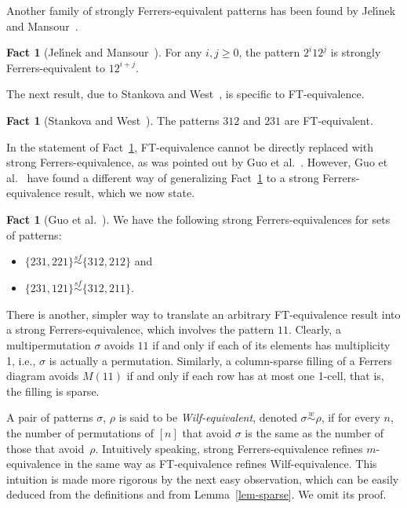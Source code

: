\documentclass[11pt]{amsart}
\theoremstyle{plain}
\theoremstyle{definition}
\newtheorem{fact}[theorem]{Fact}
\newcommand{\wsim}{\stackrel{w}{\sim}}
\newcommand{\sfsim}{\stackrel{sf}{\sim}}
\begin{document}
Another family of strongly Ferrers-equivalent patterns has been found by Jel\'\i nek and
Mansour~\cite[Lemma 39]{JM0}.

\begin{fact}[Jel\'\i nek and Mansour~\cite{JM0}]\label{fac-2p12q}
For any $i,j\ge 0$, the pattern $2^i12^j$ is strongly Ferrers-equivalent to $12^{i+j}$.
\end{fact}

The next result, due to Stankova and West~\cite{SW}, is specific to FT-equivalence.

\begin{fact}[Stankova and West~\cite{SW}]\label{fac-312}
The patterns $312$ and $231$ are FT-equivalent.
\end{fact}

In the statement of Fact~\ref{fac-312}, FT-equivalence cannot be directly replaced with strong
Ferrers-equivalence, as was pointed out by Guo et al.~\cite{GKZ}. However, Guo et
al.~\cite{GKZ} have found a different way of generalizing Fact~\ref{fac-312} to a strong
Ferrers-equivalence result, which we now state.

\begin{fact}[Guo et al.~\cite{GKZ}] We have the following strong Ferrers-equivalences for sets of
patterns:
\begin{itemize}
\item $\{231,221\}\sfsim\{312,212\}$ and
\item $\{231,121\}\sfsim\{312,211\}$.
\end{itemize}
\end{fact}

There is another, simpler way to translate an arbitrary FT-equivalence result into a strong
Ferrers-equivalence, which involves the pattern $11$. Clearly, a multipermutation $\sigma$ avoids
$11$ if and only if each of its elements has multiplicity 1, i.e., $\sigma$ is actually a
permutation. Similarly, a column-sparse filling of a Ferrers diagram avoids $M(11)$ if and only if
each row has at most one 1-cell, that is, the filling is sparse.

A pair of patterns $\sigma$, $\rho$ is said to be \emph{Wilf-equivalent}, denoted $\sigma\wsim\rho$,
if for every $n$, the number of permutations of $[n]$ that avoid $\sigma$ is the same as the number
of those that avoid~$\rho$. Intuitively speaking, strong Ferrers-equivalence refines $m$-equivalence
in the same way as FT-equivalence refines Wilf-equivalence. This intuition is made more rigorous by
the next easy observation, which can be easily deduced from the definitions and from
Lemma~\ref{lem-sparse}. We omit its proof.
\end{document}
